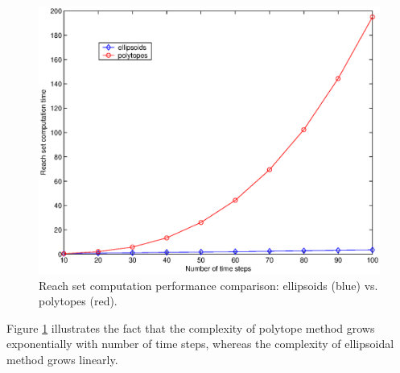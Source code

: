\documentclass{report}
\begin{document}
\begin{figure}[htbp]
\centerline{
\includegraphics[height=8 cm]{ellpoly.eps}}
\caption{Reach set computation performance comparison:
ellipsoids (blue) vs. polytopes (red).}
\label{ellpolyfig}
\end{figure}

Figure \ref{ellpolyfig}  illustrates  the fact that the
complexity of polytope method grows exponentially with number of time
steps, whereas the complexity of ellipsoidal method grows linearly.
\end{document}
